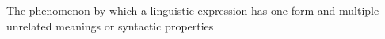 The phenomenon by which a linguistic expression has one form and multiple unrelated meanings or syntactic properties
